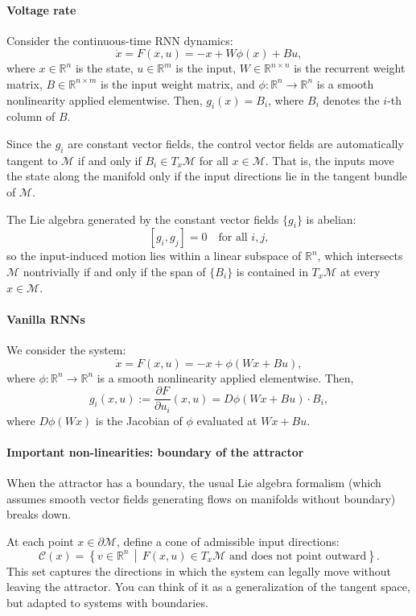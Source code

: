 \documentclass{article}
\theoremstyle{definition} \newtheorem{definition}{Definition}  \newtheorem{example}{Example}
\theoremstyle{remark} \newtheorem{remark}{Remark}
\newcounter{ct}
\begin{document}
\paragraph{Voltage rate} %
Consider the continuous-time RNN dynamics:
\[
\dot{x} = F(x, u) = -x + W\phi(x) + B u,
\]
where \( x \in \mathbb{R}^n \) is the state, \( u \in \mathbb{R}^m \) is the input, \( W \in \mathbb{R}^{n \times n} \) is the recurrent weight matrix, \( B \in \mathbb{R}^{n \times m} \) is the input weight matrix, and \( \phi : \mathbb{R}^n \to \mathbb{R}^n \) is a smooth nonlinearity applied elementwise.
Then, $g_i(x) = B_i$, where \( B_i \) denotes the \( i \)-th column of \( B \).

Since the \( g_i \) are constant vector fields, the control vector fields are automatically tangent to \( \mathcal{M} \) if and only if \( B_i \in T_x \mathcal{M} \) for all \( x \in \mathcal{M} \).
 That is, the inputs move the state along the manifold only if the input directions lie in the tangent bundle of \( \mathcal{M} \).


The Lie algebra generated by the constant vector fields \( \{g_i\} \) is abelian:
\[
[g_i, g_j] = 0 \quad \text{for all } i, j,
\]
so the input-induced motion lies within a linear subspace of \( \mathbb{R}^n \), which intersects \( \mathcal{M} \) nontrivially if and only if the span of \( \{B_i\} \) is contained in \( T_x \mathcal{M} \) at every \( x \in \mathcal{M} \).


\paragraph{Vanilla RNNs}
We consider the system:
\[
\dot{x} = F(x, u) = -x + \phi(Wx + Bu),
\]
where \( \phi : \mathbb{R}^n \to \mathbb{R}^n \) is a smooth nonlinearity applied elementwise.
Then,
\[
g_i(x, u) := \frac{\partial F}{\partial u_i}(x, u) = D\phi(Wx + Bu) \cdot B_i,
\]
where \( D\phi(Wx) \) is the Jacobian of \( \phi \) evaluated at \( Wx + Bu \).

\paragraph{Important non-linearities: boundary of the attractor}
When the attractor has a boundary, the usual Lie algebra formalism (which assumes smooth vector fields generating flows on manifolds without boundary) breaks down.

At each point \( x \in \partial \mathcal{M} \), define a cone of admissible input directions:
\[
\mathcal{C}(x) = \left\{ v \in \mathbb{R}^n \,\middle|\, F(x, u) \in T_x \mathcal{M} \text{ and does not point outward} \right\}.
\]
This set captures the directions in which the system can legally move without leaving the attractor.
 You can think of it as a generalization of the tangent space, but adapted to systems with boundaries.
\end{document}
